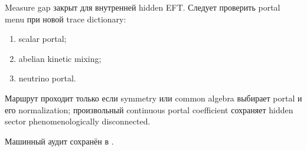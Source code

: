 \begin{protocol}
Measure gap закрыт для внутренней hidden EFT. Следует проверить portal
menu при новой trace dictionary:
\begin{enumerate}
 \item scalar portal;
 \item abelian kinetic mixing;
 \item neutrino portal.
\end{enumerate}
Маршрут проходит только если symmetry или common algebra выбирает portal
и его normalization; произвольный continuous portal coefficient
сохраняет hidden sector phenomenologically disconnected.
\end{protocol}

Машинный аудит сохранён в
.